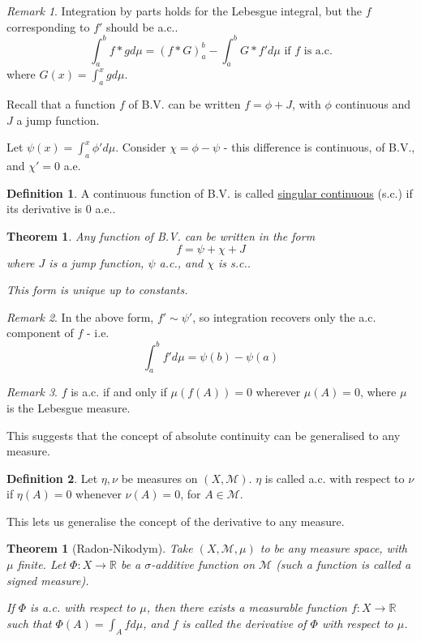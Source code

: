 \documentclass[11pt,a4paper]{report}
\newtheorem{theorem}{Theorem}[section]
\theoremstyle{plain}
\newtheorem{thm}{Theorem}[section]
\theoremstyle{definition}
\newtheorem*{defn}{Definition}
\theoremstyle{remark}
\newtheorem*{rem}{Remark}
\newcommand{\R}{\mathbb{R}}
\newcommand{\cM}{\mathcal{M}}
\begin{document}
\begin{rem}
  Integration by parts holds for the Lebesgue integral, but the $f$ corresponding to $f'$ should be a.c..
 $$ \int_a^b f * g d\mu = (f * G)_a^b - \int_a^b G * f' d\mu \text{ if $f$ is a.c.} $$
  where $G(x) = \int_a^x g d\mu$.
\end{rem}

Recall that a function $f$ of B.V. can be written $f = \phi + J$, with $\phi$ continuous and $J$ a jump function.

Let $\psi(x) = \int_a^x \phi' d\mu$. Consider $\chi = \phi - \psi$ - this difference is continuous, of B.V., and $\chi' = 0$ a.e.

\begin{defn}
    A continuous function of B.V. is called \underline{singular continuous} (s.c.) if its derivative is $0$ a.e..
\end{defn}

\begin{thm}
  Any function of B.V. can be written in the form
  $$ f = \psi + \chi + J $$ where $J$ is a jump function, $\psi$ a.c., and $\chi$ is s.c..

  This form is unique up to constants.
\end{thm}

\begin{rem}
  In the above form, $f' \sim \psi'$, so integration recovers only the a.c. component of $f$ - i.e.
  $$ \int_a^b f' d\mu = \psi(b) - \psi(a) $$
\end{rem}

\begin{rem}
  $f$ is a.c. if and only if $\mu(f(A)) = 0$ wherever $\mu(A) = 0$, where $\mu$ is the Lebesgue measure.
\end{rem}

This suggests that the concept of absolute continuity can be generalised to any measure.

\begin{defn}
Let $\eta, \nu$ be measures on $(X, \cM)$. $\eta$ is called a.c. with respect to $\nu$ if $\eta(A) = 0$ whenever $\nu(A) = 0$, for $A \in \cM$.
\end{defn}

This lets us generalise the concept of the derivative to any measure.

\begin{theorem}[Radon-Nikodym]
Take $(X, \cM, \mu)$ to be any measure space, with $\mu$ finite. Let $\Phi : X \to \R$ be a $\sigma$-additive function on $\cM$ (such a function is called a signed measure).

If $\Phi$ is a.c. with respect to $\mu$, then there exists a measurable function $f : X \to \R$ such that $\Phi(A) = \int_A f d\mu$, and $f$  is called the derivative of $\Phi$ with respect to $\mu$.
\end{theorem}
\end{document}
